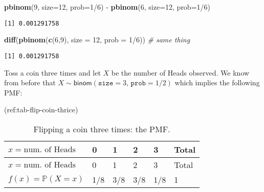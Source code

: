 \documentclass[]{book}
\newenvironment{Shaded}{\begin{snugshade}}{\end{snugshade}}
\newcommand{\KeywordTok}[1]{\textcolor[rgb]{0.13,0.29,0.53}{\textbf{{#1}}}}
\newcommand{\DataTypeTok}[1]{\textcolor[rgb]{0.13,0.29,0.53}{{#1}}}
\newcommand{\DecValTok}[1]{\textcolor[rgb]{0.00,0.00,0.81}{{#1}}}
\newcommand{\StringTok}[1]{\textcolor[rgb]{0.31,0.60,0.02}{{#1}}}
\newcommand{\CommentTok}[1]{\textcolor[rgb]{0.56,0.35,0.01}{\textit{{#1}}}}
\newcommand{\NormalTok}[1]{{#1}}
\numberwithin{equation}{chapter}
\numberwithin{figure}{chapter}
\theoremstyle{plain}
\theoremstyle{definition}
\theoremstyle{remark}
\theoremstyle{definition}
\theoremstyle{definition}
\theoremstyle{remark}
\let\BeginKnitrBlock\begin \let\EndKnitrBlock\end
\begin{document}
\begin{Shaded}
\begin{Highlighting}[]
\KeywordTok{pbinom}\NormalTok{(}\DecValTok{9}\NormalTok{, }\DataTypeTok{size=}\DecValTok{12}\NormalTok{, }\DataTypeTok{prob=}\DecValTok{1}\NormalTok{/}\DecValTok{6}\NormalTok{) -}\StringTok{ }\KeywordTok{pbinom}\NormalTok{(}\DecValTok{6}\NormalTok{, }\DataTypeTok{size=}\DecValTok{12}\NormalTok{, }\DataTypeTok{prob=}\DecValTok{1}\NormalTok{/}\DecValTok{6}\NormalTok{)}
\end{Highlighting}
\end{Shaded}

\begin{verbatim}
[1] 0.001291758
\end{verbatim}

\begin{Shaded}
\begin{Highlighting}[]
\KeywordTok{diff}\NormalTok{(}\KeywordTok{pbinom}\NormalTok{(}\KeywordTok{c}\NormalTok{(}\DecValTok{6}\NormalTok{,}\DecValTok{9}\NormalTok{), }\DataTypeTok{size =} \DecValTok{12}\NormalTok{, }\DataTypeTok{prob =} \DecValTok{1}\NormalTok{/}\DecValTok{6}\NormalTok{))  }\CommentTok{# same thing}
\end{Highlighting}
\end{Shaded}

\begin{verbatim}
[1] 0.001291758
\end{verbatim}

\bigskip

\BeginKnitrBlock{example}
\protect\hypertarget{ex:toss-coin-3-withr}{}{\label{ex:toss-coin-3-withr}}Toss
a coin three times and let \(X\) be the number of Heads observed. We
know from before that
\(X\sim\mathsf{binom}(\mathtt{size}=3,\,\mathtt{prob}=1/2)\) which
implies the following PMF:
\EndKnitrBlock{example}

(ref:tab-flip-coin-thrice)

\begin{longtable}[]{@{}llllll@{}}
\caption{Flipping a coin three times: the PMF.}\tabularnewline
\toprule
\(x=\mbox{num. of Heads}\) & 0 & 1 & 2 & 3 & Total\tabularnewline
\midrule
\endfirsthead
\toprule
\(x=\mbox{num. of Heads}\) & 0 & 1 & 2 & 3 & Total\tabularnewline
\midrule
\endhead
\(f(x) = \mathbb{P}(X = x)\) & 1/8 & 3/8 & 3/8 & 1/8 & 1\tabularnewline
\bottomrule
\end{longtable}
\end{document}
